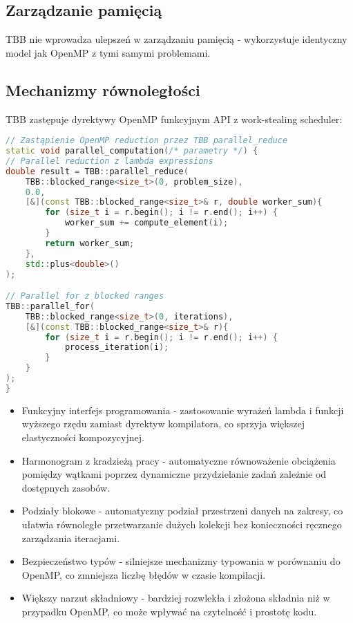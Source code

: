 \subsection{Zarządzanie pamięcią}
TBB nie wprowadza ulepszeń w zarządzaniu pamięcią - wykorzystuje identyczny model jak OpenMP z tymi samymi problemami.

\subsection{Mechanizmy równoległości}
TBB zastępuje dyrektywy OpenMP funkcyjnym API z work-stealing scheduler:
\begin{lstlisting}[language=C++, caption={Implementacja TBB - równoległość}, label={lst:TBB-parallelism}]
// Zastąpienie OpenMP reduction przez TBB parallel_reduce
static void parallel_computation(/* parametry */) {
// Parallel reduction z lambda expressions
double result = TBB::parallel_reduce(
    TBB::blocked_range<size_t>(0, problem_size), 
    0.0, 
    [&](const TBB::blocked_range<size_t>& r, double worker_sum){
        for (size_t i = r.begin(); i != r.end(); i++) {
            worker_sum += compute_element(i);
        }
        return worker_sum;
    }, 
    std::plus<double>()
);

// Parallel for z blocked ranges
TBB::parallel_for(
    TBB::blocked_range<size_t>(0, iterations), 
    [&](const TBB::blocked_range<size_t>& r){
        for (size_t i = r.begin(); i != r.end(); i++) {
            process_iteration(i);
        }
    }
);
}
\end{lstlisting}
\begin{itemize}
    \item Funkcyjny interfejs programowania - zastosowanie wyrażeń lambda i funkcji wyższego rzędu zamiast dyrektyw kompilatora, co sprzyja większej elastyczności kompozycyjnej.
    
    \item Harmonogram z kradzieżą pracy  - automatyczne równoważenie obciążenia pomiędzy wątkami poprzez dynamiczne przydzielanie zadań zależnie od dostępnych zasobów.
    
    \item Podziały blokowe - automatyczny podział przestrzeni danych na zakresy, co ułatwia równoległe przetwarzanie dużych kolekcji bez konieczności ręcznego zarządzania iteracjami.
    
    \item Bezpieczeństwo typów - silniejsze mechanizmy typowania w porównaniu do OpenMP, co zmniejsza liczbę błędów w czasie kompilacji.
    
    \item Większy narzut składniowy - bardziej rozwlekła i złożona składnia niż w przypadku OpenMP, co może wpływać na czytelność i prostotę kodu.
\end{itemize}

